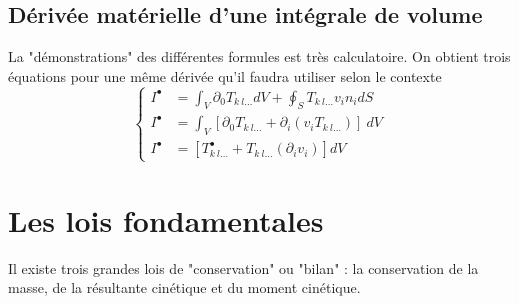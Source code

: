 \subsection{Dérivée matérielle d'une intégrale de volume}
La "démonstrations" des différentes formules est très calculatoire. On obtient trois équations pour une
même dérivée qu'il faudra utiliser selon le contexte
\begin{equation}
	\left\{\begin{array}{ll}
	I^\bullet &= \int_V \partial_0 T_{k\ l\dots} dV + \oint_S T_{k\ l\dots} v_in_i dS\\
	I^\bullet &= \int_V [\partial_0T_{k\ l\dots} + \partial_i(v_iT_{k\ l\dots})]\ dV\\
	I^\bullet &= [T_{k\ l\dots}^\bullet + T_{k\ l\dots}(\partial_iv_i)]dV
	\end{array}\right.
\end{equation}
    
    
    
\section{Les lois fondamentales}
Il existe trois grandes lois de "conservation" ou "bilan" : la conservation de la masse, de la 
résultante cinétique et du moment cinétique.
    
